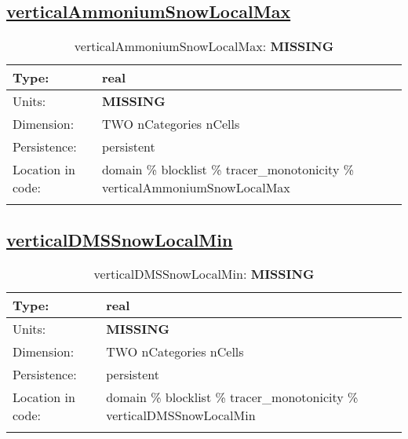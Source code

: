 \subsection[verticalAmmoniumSnowLocalMax]{\hyperref[sec:var_tab_tracer_monotonicity]{verticalAmmoniumSnowLocalMax}}
\label{subsec:var_sec_tracer_monotonicity_verticalAmmoniumSnowLocalMax}
\begin{center}
\begin{longtable}{| p{2.0in} | p{4.0in} |}
        \hline 
        Type: & real \\
        \hline 
        Units: & {\bf \color{red} MISSING} \\
        \hline 
        Dimension: & TWO nCategories nCells \\
        \hline 
        Persistence: & persistent \\
        \hline 
         Location in code: & domain \% blocklist \% tracer\_monotonicity \% verticalAmmoniumSnowLocalMax \\
         \hline 
    \caption{verticalAmmoniumSnowLocalMax: {\bf \color{red} MISSING}}
\end{longtable}
\end{center}
\subsection[verticalDMSSnowLocalMin]{\hyperref[sec:var_tab_tracer_monotonicity]{verticalDMSSnowLocalMin}}
\label{subsec:var_sec_tracer_monotonicity_verticalDMSSnowLocalMin}
\begin{center}
\begin{longtable}{| p{2.0in} | p{4.0in} |}
        \hline 
        Type: & real \\
        \hline 
        Units: & {\bf \color{red} MISSING} \\
        \hline 
        Dimension: & TWO nCategories nCells \\
        \hline 
        Persistence: & persistent \\
        \hline 
         Location in code: & domain \% blocklist \% tracer\_monotonicity \% verticalDMSSnowLocalMin \\
         \hline 
    \caption{verticalDMSSnowLocalMin: {\bf \color{red} MISSING}}
\end{longtable}
\end{center}
